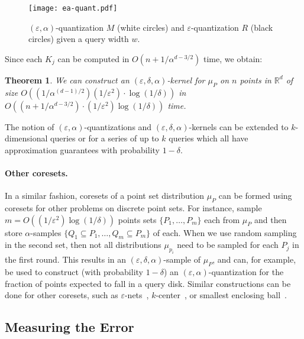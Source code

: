 \documentclass{journal}
\newcommand{\eps}{\varepsilon}
\newcommand{\R}{\ensuremath{\mathbb{R}}}
\newtheorem {theorem}{Theorem}[section]
\begin{document}
\begin{figure}[htb!]
\begin{center}
\texttt{[image: ea-quant.pdf]}
\end{center}
\caption[Error bounds in $(\eps, \alpha)$-quantization]{\label{fig:ea-quant} $(\eps,\alpha)$-quantization $M$ (white circles) and $\eps$-quantization $R$ (black circles) given a query width $w$.}
\end{figure}



Since each $K_j$ can be computed in $O(n + 1/\alpha^{d-3/2})$ time, we obtain:


\begin{theorem}
We can construct an $(\eps, \delta, \alpha)$-kernel for $\mu_P$ on $n$ points in $\R^d$ of size $O((1/\alpha^{(d-1)/2}) (1/\eps^2) \cdot \log (1/\delta))$ in $O((n + 1/\alpha^{d-3/2}) \cdot (1/\eps^2) \log (1/\delta))$ time.
\end{theorem}



The notion of $(\eps, \alpha)$-quantizations and $(\eps, \delta, \alpha)$-kernels can be extended to $k$-dimensional queries or for a series of up to $k$ queries which all have approximation guarantees with probability $1-\delta$.


\paragraph{Other coresets.}
In a similar fashion, coresets of a point set distribution $\mu_P$ can be formed using coresets for other problems on discrete point sets.  For instance, sample $m = O((1/\eps^2) \log (1/\delta))$ points sets $\{P_1, \ldots, P_m\}$ each from $\mu_P$ and then store $\alpha$-samples $\{Q_1 \subseteq P_1, \ldots, Q_m \subseteq P_m\}$ of each.
When we use random sampling in the second set, then not all distributions $\mu_{p_i}$ need to be sampled for each $P_j$ in the first round.  
This results in an $(\eps, \delta, \alpha)$-sample of $\mu_P$, and can, for example, be used to construct (with probability $1-\delta$) an $(\eps,\alpha)$-quantization for the fraction of points expected to fall in a query disk.
Similar constructions can be done for other coresets, such as $\eps$-nets~\cite{HW87}, $k$-center~\cite{APV02}, or smallest enclosing ball~\cite{BC03}.




\subsection{Measuring the Error}
\end{document}
